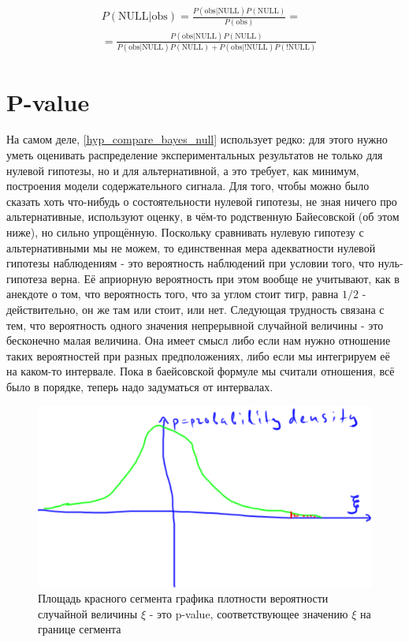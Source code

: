 \documentclass{book}
\begin{document}
\begin{align}\label{hyp_compare_bayes_null}
   &P\left(\text{NULL|obs}\right)=
   \frac{P\left(\text{obs|NULL}\right) P\left(\text{NULL}\right)}{P\left(\text{obs}\right)} = \nonumber \\
   &=\frac{P\left(\text{obs|NULL}\right) P\left(\text{NULL}\right)}{P\left(\text{obs|NULL}\right) P\left(\text{NULL}\right)+P\left(\text{obs|!NULL}\right) P\left(\text{!NULL}\right)} 
\end{align}

\section*{P-value}
На самом деле, \eqref{hyp_compare_bayes_null} использует редко: для этого нужно уметь оценивать распределение экспериментальных результатов не только для нулевой гипотезы, но и для альтернативной, а это требует, как минимум, построения модели содержательного сигнала. Для того, чтобы можно было сказать хоть что-нибудь о состоятельности нулевой гипотезы, не зная ничего про альтернативные, используют оценку, в чём-то родственную Байесовской (об этом ниже), но сильно упрощённую. Поскольку сравнивать нулевую гипотезу с альтернативными мы не можем, то единственная мера адекватности нулевой гипотезы наблюдениям - это вероятность наблюдений при условии того, что нуль-гипотеза верна. Её априорную вероятность при этом вообще не учитывают, как в анекдоте о том, что вероятность того, что за углом стоит тигр, равна $1/2$ - действительно, он же там или стоит, или нет. 
Следующая трудность связана с тем, что вероятность одного значения непрерывной случайной величины - это бесконечно малая величина. Она имеет смысл либо если нам нужно отношение таких вероятностей при разных предположениях, либо если мы интегрируем её на каком-то интервале. Пока в баейсовской формуле мы считали отношения, всё было в порядке, теперь надо задуматься от интервалах.


\begin{figure}
    \centering
    \includegraphics[scale=.5]{img/p-value.png}
    \caption{Площадь красного сегмента графика плотности вероятности случайной величины $\xi$ - это p-value, соответствующее значению $\xi$ на границе сегмента}
    \label{pval}
\end{figure}



\end{document}
